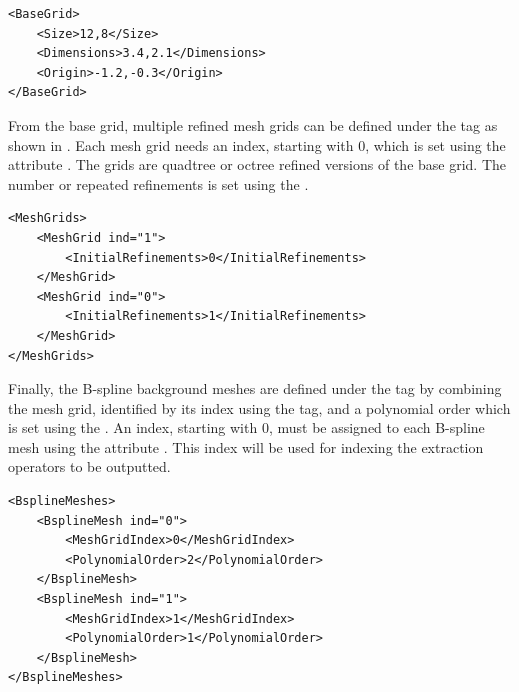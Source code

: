 \begin{minipage}{\linewidth}
\vspace{0.5cm}
\begin{lstlisting}[caption={Definition of a base grid},captionpos=b, label={lst:base_grid}]
<BaseGrid>
    <Size>12,8</Size>
    <Dimensions>3.4,2.1</Dimensions>
    <Origin>-1.2,-0.3</Origin>
</BaseGrid>
\end{lstlisting}
\end{minipage}

From the base grid, multiple refined mesh grids can be defined under the tag  as shown in . Each mesh grid needs an index, starting with $0$, which is set using the attribute . The grids are quadtree or octree refined versions of the base grid. The number or repeated refinements is set using the .

\begin{minipage}{\linewidth}
\vspace{0.5cm}
\begin{lstlisting}[caption={Definition of a multiple mesh grids},captionpos=b, label={lst:mesh_grids}]
<MeshGrids>
    <MeshGrid ind="1">
        <InitialRefinements>0</InitialRefinements>
    </MeshGrid>
    <MeshGrid ind="0">
        <InitialRefinements>1</InitialRefinements>
    </MeshGrid>
</MeshGrids>
\end{lstlisting}
\end{minipage}

\hypertarget{bspline_mesh_definition}{}
Finally, the B-spline background meshes are defined under the tag  by combining the mesh grid, identified by its index using the  tag, and a polynomial order which is set using the . An index, starting with $0$, must be assigned to each B-spline mesh using the attribute . This index will be used for indexing the extraction operators to be outputted.

\begin{minipage}{\linewidth}
\vspace{0.5cm}
\begin{lstlisting}[caption={Definition of a multiple mesh grids},captionpos=b, label={lst:bsp_meshes}]
<BsplineMeshes>
    <BsplineMesh ind="0">
        <MeshGridIndex>0</MeshGridIndex>
        <PolynomialOrder>2</PolynomialOrder>
    </BsplineMesh>
    <BsplineMesh ind="1">
        <MeshGridIndex>1</MeshGridIndex>
        <PolynomialOrder>1</PolynomialOrder>
    </BsplineMesh>
</BsplineMeshes>
\end{lstlisting}
\end{minipage}

